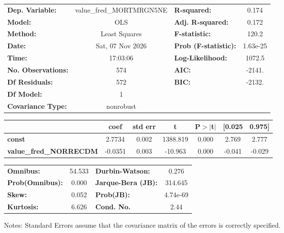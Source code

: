 \begin{center}
\begin{tabular}{lclc}
\toprule
\textbf{Dep. Variable:}        & value\_fred\_MORTMRGN5NE & \textbf{  R-squared:         } &     0.174   \\
\textbf{Model:}                &           OLS            & \textbf{  Adj. R-squared:    } &     0.172   \\
\textbf{Method:}               &      Least Squares       & \textbf{  F-statistic:       } &     120.2   \\
\textbf{Date:}                 &     Sat, 07 Nov 2026     & \textbf{  Prob (F-statistic):} &  1.63e-25   \\
\textbf{Time:}                 &         17:03:06         & \textbf{  Log-Likelihood:    } &    1072.5   \\
\textbf{No. Observations:}     &             574          & \textbf{  AIC:               } &    -2141.   \\
\textbf{Df Residuals:}         &             572          & \textbf{  BIC:               } &    -2132.   \\
\textbf{Df Model:}             &               1          & \textbf{                     } &             \\
\textbf{Covariance Type:}      &        nonrobust         & \textbf{                     } &             \\
\bottomrule
\end{tabular}
\begin{tabular}{lcccccc}
                               & \textbf{coef} & \textbf{std err} & \textbf{t} & \textbf{P$> |$t$|$} & \textbf{[0.025} & \textbf{0.975]}  \\
\midrule
\textbf{const}                 &       2.7734  &        0.002     &  1388.819  &         0.000        &        2.769    &        2.777     \\
\textbf{value\_fred\_NORRECDM} &      -0.0351  &        0.003     &   -10.963  &         0.000        &       -0.041    &       -0.029     \\
\bottomrule
\end{tabular}
\begin{tabular}{lclc}
\textbf{Omnibus:}       & 54.533 & \textbf{  Durbin-Watson:     } &    0.276  \\
\textbf{Prob(Omnibus):} &  0.000 & \textbf{  Jarque-Bera (JB):  } &  314.645  \\
\textbf{Skew:}          &  0.052 & \textbf{  Prob(JB):          } & 4.74e-69  \\
\textbf{Kurtosis:}      &  6.626 & \textbf{  Cond. No.          } &     2.44  \\
\bottomrule
\end{tabular}
\end{center}

Notes: \newline
 [1] Standard Errors assume that the covariance matrix of the errors is correctly specified.